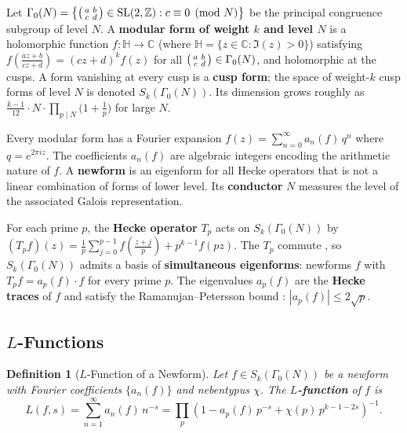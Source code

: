 \documentclass[11pt]{article}
\newtheorem{definition}{Definition}
\DeclareMathOperator{\SL}{SL}
\newcommand{\Z}{\mathbb{Z}}
\newcommand{\C}{\mathbb{C}}
\newcommand{\Gammazero}{\Gamma_0}
\newcommand{\Hhalf}{\mathbb{H}}
\begin{document}
Let $\Gammazero(N) = \left\{\begin{psmallmatrix} a & b \\ c & d \end{psmallmatrix} \in \SL(2,\Z) : c \equiv 0 \pmod{N}\right\}$ be the principal congruence subgroup of level $N$. A \textbf{modular form of weight $k$ and level $N$} is a holomorphic function $f : \Hhalf \to \C$ (where $\Hhalf = \{z \in \C : \Im(z) > 0\}$) satisfying
$f\!\left(\frac{az + b}{cz + d}\right) = (cz + d)^k f(z)$ for all $\begin{psmallmatrix} a & b \\ c & d \end{psmallmatrix} \in \Gammazero(N)$, and holomorphic at the cusps. A form vanishing at every cusp is a \textbf{cusp form}; the space of weight-$k$ cusp forms of level $N$ is denoted $S_k(\Gammazero(N))$. Its dimension grows roughly as $\frac{k-1}{12} \cdot N \cdot \prod_{p \mid N}\!\bigl(1 + \tfrac{1}{p}\bigr)$ for large $N$.

Every modular form has a Fourier expansion $f(z) = \sum_{n=0}^{\infty} a_n(f) \, q^n$ where $q = e^{2\pi i z}$. The coefficients $a_n(f)$ are algebraic integers encoding the arithmetic nature of $f$. A \textbf{newform} is an eigenform for all Hecke operators that is not a linear combination of forms of lower level. Its \textbf{conductor} $N$ measures the level of the associated Galois representation.

For each prime $p$, the \textbf{Hecke operator} $T_p$ acts on $S_k(\Gammazero(N))$ by $(T_p f)(z) = \frac{1}{p} \sum_{j=0}^{p-1} f\!\left(\frac{z + j}{p}\right) + p^{k-1} f(pz)$. The $T_p$ commute \citep{diamond2005first}, so $S_k(\Gammazero(N))$ admits a basis of \textbf{simultaneous eigenforms}: newforms $f$ with $T_p f = a_p(f) \cdot f$ for every prime $p$. The eigenvalues $a_p(f)$ are the \textbf{Hecke traces} of $f$ and satisfy the Ramanujan--Petersson bound \citep{deligne1974}: $|a_p(f)| \leq 2\sqrt{p}$.

\subsection{$L$-Functions}

\begin{definition}[$L$-Function of a Newform]
Let $f \in S_k(\Gammazero(N))$ be a newform with Fourier coefficients $\{a_n(f)\}$ and nebentypus $\chi$. The \textbf{$L$-function} of $f$ is
\[
  L(f, s) = \sum_{n=1}^{\infty} a_n(f) \, n^{-s} = \prod_{p} \left(1 - a_p(f) \, p^{-s} + \chi(p) \, p^{k - 1 - 2s}\right)^{-1}.
\]
\end{definition}
\end{document}
